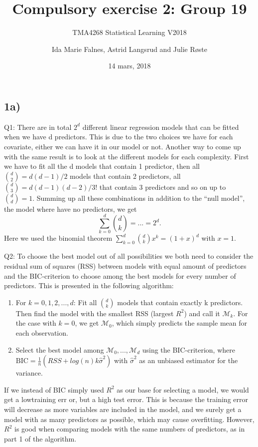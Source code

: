 \documentclass[]{article}
\title{Compulsory exercise 2: Group 19}
\subtitle{TMA4268 Statistical Learning V2018}
\author{Ida Marie Falnes, Astrid Langsrud and Julie Røste}
\date{14 mars, 2018}
\begin{document}
\maketitle

\subsection{1a)}\label{a}

Q1: There are in total \(2^d\) different linear regression models that
can be fitted when we have d predictors. This is due to the two choices
we have for each covariate, either we can have it in our model or not.
Another way to come up with the same result is to look at the different
models for each complexity. First we have to fit all the d models that
contain 1 predictor, then all \(\binom{d}{2}=d(d-1)/2\) models that
contain 2 predictors, all \(\binom{d}{3}=d(d-1)(d-2)/3!\) that contain 3
predictors and so on up to \(\binom{d}{d}=1\). Summing up all these
combinations in addition to the ``null model'', the model where have no
predictors, we get \[\sum_{k=0}^{d} \binom{d}{k} = ... = 2^d.\] Here we
used the binomial theorem \(\sum_{k=0}^{d}\binom{d}{k}x^k=(1+x)^d\) with
\(x=1\).

Q2: To choose the best model out of all possibilities we both need to
consider the residual sum of squares (RSS) between models with equal
amount of predictors and the BIC-criterion to choose among the best
models for every number of predictors. This is presented in the
following algorithm:

\begin{enumerate}
\def\labelenumi{\arabic{enumi}.}
\item
  For \(k=0,1,2,...,d\): \newline
  Fit all \(\binom{d}{k}\) models that contain exactly k predictors.
  Then find the model with the smallest RSS (largest \(R^2\)) and call
  it \(\mathcal{M}_k\). For the case with \(k=0\), we get
  \(\mathcal{M}_0\), which simply predicts the sample mean for each
  observation.
\item
  Select the best model among \(\mathcal{M}_0, ...,\mathcal{M}_d\) using
  the BIC-criterion, where
  \(\text{BIC}=\frac{1}{n}(RSS+log(n)k{\hat\sigma}^2)\) with
  \({\hat\sigma}^2\) as an unbiased estimator for the variance.
\end{enumerate}

If we instead of BIC simply used \(R^2\) as our base for selecting a
model, we would get a lowtraining err or, but a high test error. This is
because the training error will decrease as more variables are included
in the model, and we surely get a model with as many predictors as
possible, which may cause overfitting. However, \(R^2\) is good when
comparing models with the same numbers of predictors, as in part 1 of
the algorithm.
\end{document}
